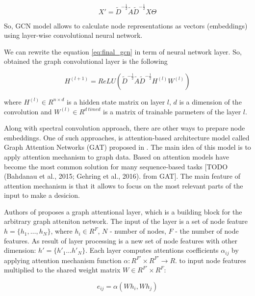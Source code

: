 \begin{equation}
    X' = \tilde{D}^{-\frac{1}{2}}\tilde{A}\tilde{D}^{-\frac{1}{2}}X\Theta
    \label{eq:final_gcn}
\end{equation}

So, GCN model allows to calculate node representations as vectors (embeddings) using layer-wise convolutional neural network.

We can rewrite the equation \ref{eq:final_gcn} in term of neural network layer. So, obtained the graph convolutional layer 
is the following


\begin{equation}
    H^{(l+1)} = ReLU(\tilde{D}^{-\frac{1}{2}}\tilde{A}\tilde{D}^{-\frac{1}{2}}H^{(l)}W^{(l)})
    \label{eq:final_gcn_nn}
\end{equation}

where $H^{(l)} \in R^{n \times d}$ is a hidden state matrix on layer $l$, $d$ is a dimension
of the convolution and $W^{(l)} \in R^{d \ time d}$ is a matrix of trainable parmeters of the layer $l$.




Along with spectral convolution approach, there are other ways to prepare node embeddings. One of such approaches, is 
attention-based architecture model called Graph Attention Networks (GAT) proposed in \cite{GAT}.
The main idea of this model is to apply attention mechanism to graph data. Based on attention models have become 
the most common solution for many sequence-based tasks [TODO (Bahdanau et al., 2015; Gehring et al., 2016). from GAT].
The main feature of attention mechanism is that it allows to focus on the most relevant parts of the input 
to make a desicion.

Authors of \cite{GAT} proposes a graph attentional layer, which is a building block for the arbitrary graph atteniton network.
The input of the layer is a set of node feature $ h=\{ h_1,\dots , h_N \}$, where $h_i \in R^F$, $N$ - number of nodes, $F$ - the number
of node features. As result of layer processing is a new set of node features with other dimension: $h' = \{ h'_1 \dots h'_N \}$.
Each layer computes attentions coefficients $\alpha_{ij}$ by applying attention mechanism function $\alpha : R^{F'} \times R^{F'} \rightarrow R$.
to input node features multiplied to the shared weight matrix $W \in R^{F'} \times R^{F}$:

\begin{equation}
    e_{ij} = \alpha(Wh_i, Wh_j)
    \label{eq:att_coeff}
\end{equation}

